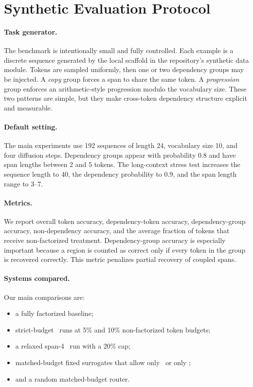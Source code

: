 \section{Synthetic Evaluation Protocol}
\label{sec:setup}

\paragraph{Task generator.}
The benchmark is intentionally small and fully controlled. Each example is a discrete sequence generated by the local scaffold in the repository's synthetic data module. Tokens are sampled uniformly, then one or two dependency groups may be injected. A \emph{copy} group forces a span to share the same token. A \emph{progression} group enforces an arithmetic-style progression modulo the vocabulary size. These two patterns are simple, but they make cross-token dependency structure explicit and measurable.

\paragraph{Default setting.}
The main experiments use 192 sequences of length 24, vocabulary size 10, and four diffusion steps. Dependency groups appear with probability 0.8 and have span lengths between 2 and 5 tokens. The long-context stress test increases the sequence length to 40, the dependency probability to 0.9, and the span length range to 3--7.

\paragraph{Metrics.}
We report overall token accuracy, dependency-token accuracy, dependency-group accuracy, non-dependency accuracy, and the average fraction of tokens that receive non-factorized treatment. Dependency-group accuracy is especially important because a region is counted as correct only if every token in the group is recovered correctly. This metric penalizes partial recovery of coupled spans.

\paragraph{Systems compared.}
Our main comparisons are:
\begin{itemize}
\item a fully factorized baseline;
\item strict-budget \method\ runs at 5\% and 10\% non-factorized token budgets;
\item a relaxed span-4 \method\ run with a 20\% cap;
\item matched-budget fixed surrogates that allow only \coupled\ or only \micro;
\item and a random matched-budget router.
\end{itemize}

